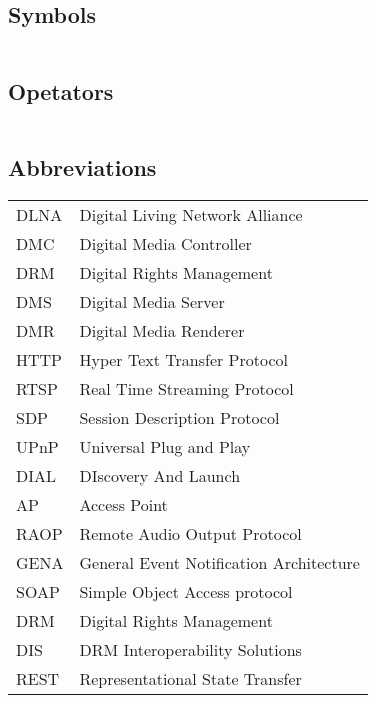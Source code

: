 
\subsection*{Symbols}

\begin{tabular}{ll}

\end{tabular}

\subsection*{Opetators} 

\begin{tabular}{ll}

\end{tabular}

\subsection*{Abbreviations}

\begin{tabular}{ll}
DLNA       & Digital Living Network Alliance\label{dlna_shortfor} \\ 
DMC        & Digital Media Controller \\
DRM        & Digital Rights Management \\ 
DMS        & Digital Media Server \\
DMR        & Digital Media Renderer \\
HTTP       & Hyper Text Transfer Protocol \\
RTSP       & Real Time Streaming Protocol \\
SDP    	& Session Description Protocol\\ 
UPnP	   & Universal Plug and Play \label{upnp_shortfor} \\
DIAL	   & DIscovery And Launch \label{dial_shortfor} \\
AP	   & Access Point \\
RAOP	   & Remote Audio Output Protocol\\
GENA		& General Event Notification Architecture\\
SOAP		& Simple Object Access protocol\\
DRM		& Digital Rights Management\\
DIS		& DRM Interoperability Solutions\\
REST		& Representational State Transfer\\
\end{tabular}
